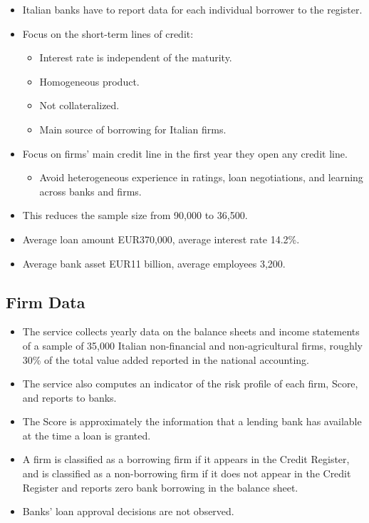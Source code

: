 \documentclass[]{book}
\providecommand{\tightlist}{%
  \setlength{\itemsep}{0pt}\setlength{\parskip}{0pt}}
\begin{document}
\begin{itemize}
\tightlist
\item
  Italian banks have to report data for each individual borrower to the
  register.
\item
  Focus on the short-term lines of credit:

  \begin{itemize}
  \tightlist
  \item
    Interest rate is independent of the maturity.
  \item
    Homogeneous product.
  \item
    Not collateralized.
  \item
    Main source of borrowing for Italian firms.
  \end{itemize}
\item
  Focus on firms' main credit line in the first year they open any
  credit line.

  \begin{itemize}
  \tightlist
  \item
    Avoid heterogeneous experience in ratings, loan negotiations, and
    learning across banks and firms.
  \end{itemize}
\item
  This reduces the sample size from 90,000 to 36,500.
\item
  Average loan amount EUR370,000, average interest rate 14.2\%.
\item
  Average bank asset EUR11 billion, average employees 3,200.
\end{itemize}

\subsection{Firm Data}\label{firm-data}

\begin{itemize}
\tightlist
\item
  The service collects yearly data on the balance sheets and income
  statements of a sample of 35,000 Italian non-financial and
  non-agricultural firms, roughly 30\% of the total value added reported
  in the national accounting.
\item
  The service also computes an indicator of the risk profile of each
  firm, Score, and reports to banks.
\item
  The Score is approximately the information that a lending bank has
  available at the time a loan is granted.
\item
  A firm is classified as a borrowing firm if it appears in the Credit
  Register, and is classified as a non-borrowing firm if it does not
  appear in the Credit Register and reports zero bank borrowing in the
  balance sheet.
\item
  Banks' loan approval decisions are not observed.
\end{itemize}
\end{document}
